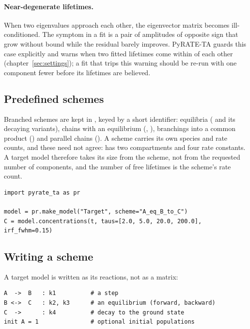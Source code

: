 \paragraph{Near-degenerate lifetimes.} When two eigenvalues approach each
other, the eigenvector matrix becomes ill-conditioned. The symptom in a fit is a
pair of amplitudes of opposite sign that grow without bound while the residual
barely improves. PyRATE-TA guards this case explicitly and warns when two fitted
lifetimes come within  of each other
(chapter~\ref{sec:settings}); a fit that trips this warning should be re-run
with one component fewer before its lifetimes are believed.

\subsection{Predefined schemes}

Branched schemes are kept in , keyed by a
short identifier: equilibria ( and its decaying variants),
chains with an equilibrium (, ),
branchings into a common product () and parallel
chains (). A scheme carries its own species
and rate counts, and these need not agree:  has two
compartments and four rate constants. A target model therefore takes its size
from the scheme, not from the requested number of components, and the number of
free lifetimes is the scheme's rate count.

\begin{lstlisting}
import pyrate_ta as pr

model = pr.make_model("Target", scheme="A_eq_B_to_C")
C = model.concentrations(t, taus=[2.0, 5.0, 20.0, 200.0], irf_fwhm=0.15)
\end{lstlisting}

\subsection{Writing a scheme}\label{sec:notation}

A target model is written as its reactions, not as a matrix:

\begin{lstlisting}
A  ->  B   : k1          # a step
B <->  C   : k2, k3      # an equilibrium (forward, backward)
C  ->      : k4          # decay to the ground state
init A = 1               # optional initial populations
\end{lstlisting}

